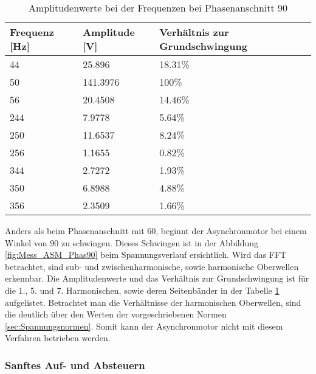 \begin{table}[ht!]
	\centering
	\begin{tabular}{|l|l|l|}
		\hline
		Frequenz {[}Hz{]} & Amplitude {[}V{]} & Verhältnis zur Grundschwingung \\ \hline
		44                & 25.896            & 18.31\%                        \\ \hline
		50                & 141.3976          & 100\%                          \\ \hline
		56                & 20.4508           & 14.46\%                        \\ \hline
		244               & 7.9778            & 5.64\%                         \\ \hline
		250               & 11.6537           & 8.24\%                         \\ \hline
		256               & 1.1655            & 0.82\%                         \\ \hline
		344               & 2.7272            & 1.93\%                         \\ \hline
		350               & 6.8988            & 4.88\%                         \\ \hline
		356               & 2.3509            & 1.66\%                         \\ \hline
	\end{tabular}
\caption{Amplitudenwerte bei der Frequenzen bei Phasenanschnitt 90\textdegree}\label{tab:Mess_Spannung_ASM_Phas90}
\end{table}

Anders als beim Phasenanschnitt mit 60\textdegree, beginnt der Asynchronmotor bei einem Winkel von 90\textdegree \hspace{0.02cm} zu schwingen. Dieses Schwingen ist in der Abbildung \ref{fig:Mess_ASM_Phas90} beim Spannungsverlauf ersichtlich. Wird das FFT betrachtet, sind sub- und zwischenharmonische, sowie harmonische Oberwellen erkennbar. Die Amplitudenwerte und das Verhältnis zur Grundschwingung ist für die 1., 5. und 7. Harmonischen, sowie deren Seitenbänder in der Tabelle \ref{tab:Mess_Spannung_ASM_Phas90} aufgelistet. Betrachtet man die Verhältnisse der harmonischen Oberwellen, sind die deutlich über den Werten der vorgeschriebenen Normen \ref{sec:Spannungsnormen}. Somit kann der Asynchronmotor nicht mit diesem Verfahren betrieben werden.  


\newpage
\subsubsection*{Sanftes Auf- und Absteuern}

